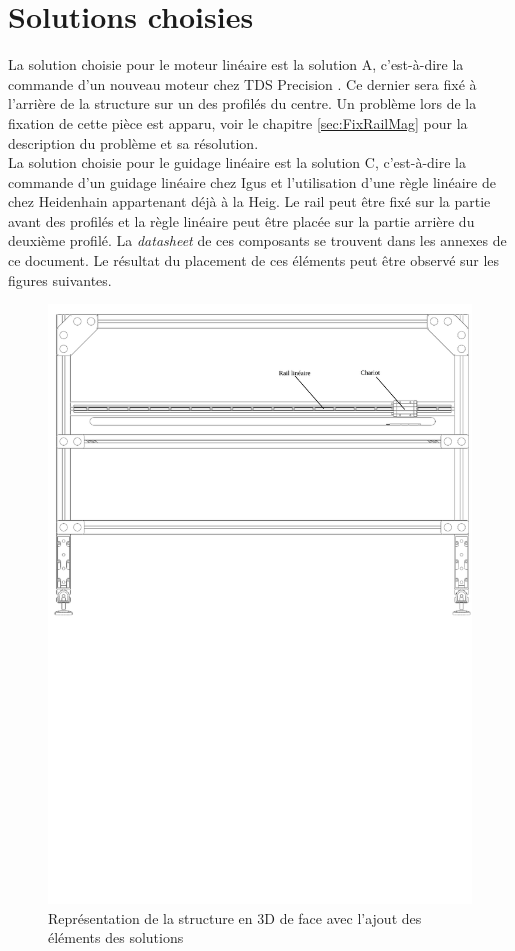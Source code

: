 \section{Solutions choisies}\label{sec:SolChoix}

La solution choisie pour le moteur linéaire est la solution A, c'est-à-dire la commande d'un nouveau moteur chez TDS Precision \cite{TDSPrecisionProducts}. Ce dernier
sera fixé à l'arrière de la structure sur un des profilés du centre. Un problème lors de la fixation de cette pièce est apparu, voir le chapitre
\ref{sec:FixRailMag} pour la description du problème et sa résolution.\\

La solution choisie pour le guidage linéaire est la solution C, c'est-à-dire la commande d'un guidage linéaire chez Igus \cite{Igus} et l'utilisation d'une
règle linéaire de chez Heidenhain \cite{Heidenhain} appartenant déjà à la \acrshort{Heig}. Le rail peut être fixé sur la partie avant des profilés et la règle linéaire peut
être placée sur la partie arrière du deuxième profilé. La \textit{datasheet} de ces composants se trouvent dans les annexes de ce document. Le résultat du placement de ces
éléments peut être observé sur les figures suivantes.

\begin{figure}[H]
    \centering
    \includegraphics[width = \textwidth]{assets/figures/VueFace.svg}
    \caption{Représentation de la structure en 3D de face avec l'ajout des éléments des solutions}
    \label{fig:VueFace}
\end{figure}

